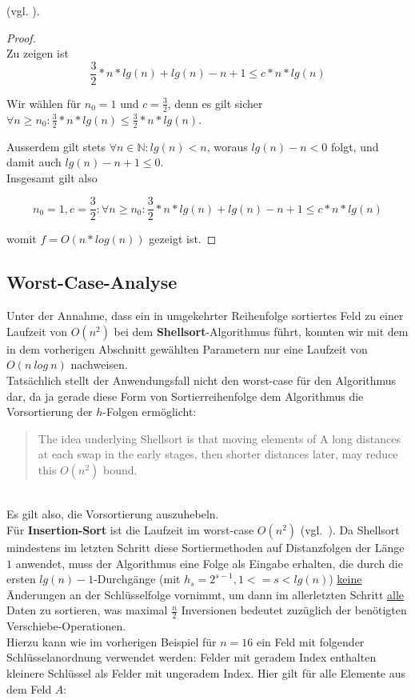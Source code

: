 {(vgl. \cite[11]{GD18a}).
\begin{proof}\label{pr:nlogn}
    \\
Zu zeigen ist
\begin{equation}
\frac{3}{2} * n * lg(n) + lg(n) - n + 1 \leq c * n * lg(n)
\end{equation}

Wir wählen für $n_0 = 1$  und $c = \frac{3}{2}$, denn es gilt sicher $\forall n \geq n_0: \frac{3}{2} * n * lg(n)  \leq \frac{3}{2} * n * lg(n)$.

Ausserdem gilt stets $\forall n \in \mathbb{N}: lg(n) < n$, woraus $lg(n) - n < 0$ folgt, und damit auch $lg(n) - n + 1 \leq 0$.
\\
Insgesamt gilt also

\begin{equation}
n_0 = 1, c = \frac{3}{2}: \forall n \geq n_0: \frac{3}{2} * n * lg(n) + lg(n) - n + 1 \leq c * n * lg(n)
\end{equation}

    womit $f = O(n * log(n))$ gezeigt ist.\blacksquare
\end{proof}

\subsection*{Worst-Case-Analyse}

Unter der Annahme, dass ein in umgekehrter Reihenfolge sortiertes Feld zu einer Laufzeit von $O(n^2)$ bei dem \textbf{Shellsort}-Algorithmus führt, konnten wir mit dem in dem vorherigen Abschnitt gewählten Parametern nur eine Laufzeit von $O(n\ log\ n)$ nachweisen.
\\

Tatsächlich stellt der Anwendungsfall nicht den worst-case für den Algorithmus dar, da ja gerade diese Form von Sortierreihenfolge dem Algorithmus die Vorsortierung der $h$-Folgen ermöglicht:
\\
\blockquote[{\cite[3]{Pra72}}]{
    The idea underlying Shellsort is that moving elements of A long
    distances at each swap in the early stages, then shorter distances later,
    may reduce this $O(n^2)$ bound.
}
\\

Es gilt also, die Vorsortierung auszuhebeln.
\\

Für \textbf{Insertion-Sort} ist die Laufzeit im worst-case $O(n^2)$ (vgl.~\cite[87]{OW17b}). Da Shellsort mindestens im letzten Schritt diese Sortiermethoden auf Distanzfolgen der Länge $1$ anwendet, muss der Algorithmus eine Folge als Eingabe erhalten, die durch die ersten $lg(n) - 1$-Durchgänge (mit $h_s = 2^{s - 1}, 1 <= s < lg(n)$) \underline{keine} Änderungen an der Schlüsselfolge vornimmt, um dann im allerletzten Schritt \underline{alle} Daten zu sortieren, was maximal $\frac{n}{2}$ Inversionen bedeutet zuzüglich der benötigten Verschiebe-Operationen.
\\
Hierzu kann wie im vorherigen Beispiel für $n=16$ ein Feld mit folgender Schlüsselanordnung verwendet werden: Felder mit geradem Index enthalten kleinere Schlüssel als Felder mit ungeradem Index.
Hier gilt für alle Elemente aus dem Feld $A$:

}
